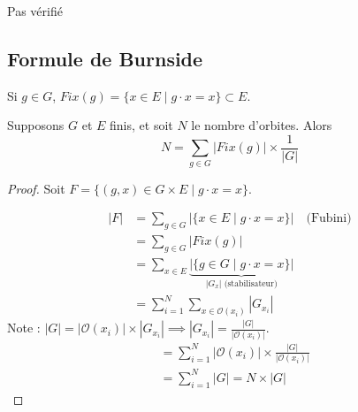 Pas vérifié

\subsection*{Formule de Burnside}

Si $g \in G$, $Fix(g) = \{ x \in E \mid g \cdot x = x \} \subset E$.

\begin{theorement}{}{}
Supposons $G$ et $E$ finis, et soit $N$ le nombre d'orbites.
Alors \[ N = \sum_{g \in G} |Fix(g)| \times \frac{1}{|G|} \]
\end{theorement}

\begin{proof}
    Soit $F = \{ (g,x) \in G \times E \mid g \cdot x = x \}$.

    \noindent\begin{minipage}{0.65\textwidth}
    \begin{align*}
    |F| &= \sum_{g \in G} |\{ x \in E \mid g \cdot x = x \}| \quad \text{(Fubini)} \\
        &= \sum_{g \in G} |Fix(g)| \\
        &= \sum_{x \in E} \underbrace{|\{ g \in G \mid g \cdot x = x \}|}_{|G_x| \text{ (stabilisateur)}} \\
        &= \sum_{i=1}^N \sum_{x \in \mathcal{O}(x_i)} |G_{x_i}|
    \end{align*}
    Note : $|G| = |\mathcal{O}(x_i)| \times |G_{x_i}| \implies |G_{x_i}| = \frac{|G|}{|\mathcal{O}(x_i)|}$.
    \begin{align*}
        &= \sum_{i=1}^N |\mathcal{O}(x_i)| \times \frac{|G|}{|\mathcal{O}(x_i)|} \\
        &= \sum_{i=1}^N |G| = N \times |G|
    \end{align*}
    \end{minipage}%
    \begin{minipage}{0.35\textwidth}
    \centering
    \end{minipage}
\end{proof} 

